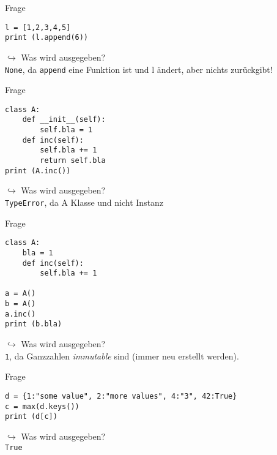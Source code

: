 \begin{frame}[fragile]{Frage }
    \begin{lstlisting}
l = [1,2,3,4,5]
print (l.append(6))
    \end{lstlisting}
    $\hookrightarrow$ Was wird ausgegeben?\\
    \pause
    \texttt{None}, da \texttt{append} eine Funktion ist und l ändert, aber nichts zurückgibt!
\end{frame}



\begin{frame}[fragile]{Frage }
    \begin{lstlisting}
class A:
    def __init__(self):
        self.bla = 1
    def inc(self):
        self.bla += 1
        return self.bla
print (A.inc())
    \end{lstlisting}
    $\hookrightarrow$ Was wird ausgegeben?\\
    \pause
    \texttt{TypeError}, da A Klasse und nicht Instanz
\end{frame}

\begin{frame}[fragile]{Frage }
    \begin{lstlisting}
class A:
    bla = 1
    def inc(self):
        self.bla += 1

a = A()
b = A()
a.inc()
print (b.bla)
    \end{lstlisting}
    $\hookrightarrow$ Was wird ausgegeben?\\
    \pause
    \texttt{1}, da Ganzzahlen \emph{immutable} sind (immer neu erstellt werden).
\end{frame}


\begin{frame}[fragile]{Frage }
    \begin{lstlisting}
d = {1:"some value", 2:"more values", 4:"3", 42:True}
c = max(d.keys())
print (d[c])
    \end{lstlisting}
    $\hookrightarrow$ Was wird ausgegeben?\\
    \pause
    \texttt{True}
\end{frame}

